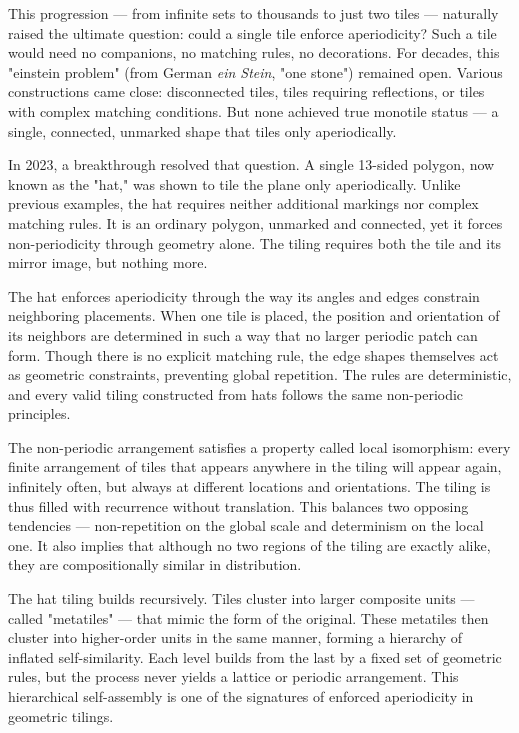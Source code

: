 This progression — from infinite sets to thousands to just two tiles — naturally raised the ultimate question: could a single tile enforce aperiodicity? Such a tile would need no companions, no matching rules, no decorations. For decades, this "einstein problem" (from German \emph{ein Stein}, "one stone") remained open. Various constructions came close: disconnected tiles, tiles requiring reflections, or tiles with complex matching conditions. But none achieved true monotile status — a single, connected, unmarked shape that tiles only aperiodically.

In 2023, a breakthrough resolved that question. A single 13-sided polygon, now known as the "hat," was shown to tile the plane only aperiodically. Unlike previous examples, the hat requires neither additional markings nor complex matching rules. It is an ordinary polygon, unmarked and connected, yet it forces non-periodicity through geometry alone. The tiling requires both the tile and its mirror image, but nothing more.

The hat enforces aperiodicity through the way its angles and edges constrain neighboring placements. When one tile is placed, the position and orientation of its neighbors are determined in such a way that no larger periodic patch can form. Though there is no explicit matching rule, the edge shapes themselves act as geometric constraints, preventing global repetition. The rules are deterministic, and every valid tiling constructed from hats follows the same non-periodic principles.

The non-periodic arrangement satisfies a property called local isomorphism: every finite arrangement of tiles that appears anywhere in the tiling will appear again, infinitely often, but always at different locations and orientations. The tiling is thus filled with recurrence without translation. This balances two opposing tendencies — non-repetition on the global scale and determinism on the local one. It also implies that although no two regions of the tiling are exactly alike, they are compositionally similar in distribution.

The hat tiling builds recursively. Tiles cluster into larger composite units — called "metatiles" — that mimic the form of the original. These metatiles then cluster into higher-order units in the same manner, forming a hierarchy of inflated self-similarity. Each level builds from the last by a fixed set of geometric rules, but the process never yields a lattice or periodic arrangement. This hierarchical self-assembly is one of the signatures of enforced aperiodicity in geometric tilings.

